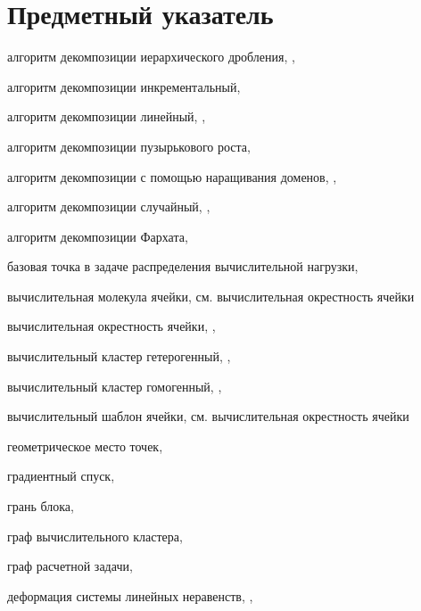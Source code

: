 \newpage

\section*{Предметный указатель}

алгоритм декомпозиции иерархического дробления, \pageref{term:alg_decomp_hierarch}, \pageref{term:alg_decomp_hierarch2}

алгоритм декомпозиции инкрементальный, \pageref{term:alg_decomp_inc}

алгоритм декомпозиции линейный, \pageref{term:alg_decomp_linear}, \pageref{term:alg_decomp_linear2}

алгоритм декомпозиции пузырькового роста, \pageref{term:alg_decomp_bubble}

алгоритм декомпозиции с помощью наращивания доменов, \pageref{term:alg_decomp_rgrow}, \pageref{term:alg_decomp_rgrow2}

алгоритм декомпозиции случайный, \pageref{term:alg_decomp_random}, \pageref{term:alg_decomp_random2}

алгоритм декомпозиции Фархата, \pageref{term:alg_decomp_farhat}

базовая точка в задаче распределения вычислительной нагрузки, \pageref{term:distr_base_point}

вычислительная молекула ячейки, см. вычислительная окрестность ячейки

вычислительная окрестность ячейки, \pageref{term:cell_calc_template}, \pageref{term:cell_calc_template2}

вычислительный кластер гетерогенный, \pageref{term:cluster_getero}, \pageref{term:cluster_getero2}

вычислительный кластер гомогенный, \pageref{term:cluster_gomo}, \pageref{term:cluster_gomo2}

вычислительный шаблон ячейки, см. вычислительная окрестность ячейки

геометрическое место точек, \pageref{term:gmt}

градиентный спуск, \pageref{term:gradient_spusk}

грань блока, \pageref{term:block_facet}

граф вычислительного кластера, \pageref{term:graph_cluster}

граф расчетной задачи, \pageref{term:graph_task}

деформация системы линейных неравенств, \pageref{term:deform_sys_lin_neravenstv}, \pageref{term:deform_sys_lin_neravenstv2}

